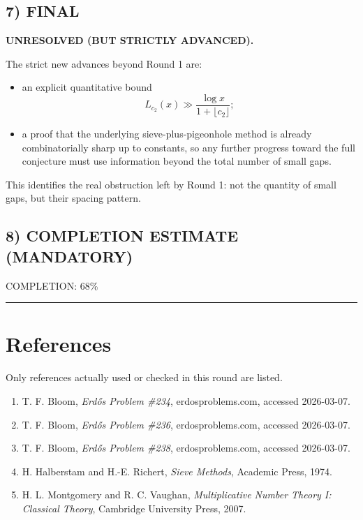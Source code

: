 \subsection*{7) FINAL}

\textbf{UNRESOLVED (BUT STRICTLY ADVANCED).}

The strict new advances beyond Round 1 are:
\begin{itemize}
\item an explicit quantitative bound
\[
L_{c_2}(x)\gg \frac{\log x}{1+\lfloor c_2\rfloor};
\]
\item a proof that the underlying sieve-plus-pigeonhole method is already combinatorially sharp up to constants, so any further progress toward the full conjecture must use information beyond the total number of small gaps.
\end{itemize}

This identifies the real obstruction left by Round 1: not the quantity of small gaps, but their spacing pattern.

\subsection*{8) COMPLETION ESTIMATE (MANDATORY)}

COMPLETION: 68\%

\bigskip
\hrule
\bigskip

\section*{References}

Only references actually used or checked in this round are listed.

\begin{enumerate}
\item T. F. Bloom, \emph{Erd\H{o}s Problem \#234}, erdosproblems.com, accessed 2026-03-07.
\item T. F. Bloom, \emph{Erd\H{o}s Problem \#236}, erdosproblems.com, accessed 2026-03-07.
\item T. F. Bloom, \emph{Erd\H{o}s Problem \#238}, erdosproblems.com, accessed 2026-03-07.
\item H. Halberstam and H.-E. Richert, \emph{Sieve Methods}, Academic Press, 1974.
\item H. L. Montgomery and R. C. Vaughan, \emph{Multiplicative Number Theory I: Classical Theory}, Cambridge University Press, 2007.
\end{enumerate}
